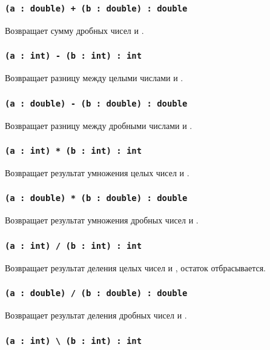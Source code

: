 \subsubsection{\lstinline|(a : double) + (b : double) : double|}

Возвращает сумму дробных чисел  и .

\subsubsection{\lstinline|(a : int) - (b : int) : int|}

Возвращает разницу между целыми числами  и .

\subsubsection{\lstinline|(a : double) - (b : double) : double|}

Возвращает разницу между дробными числами  и .

\subsubsection{\lstinline|(a : int) * (b : int) : int|}

Возвращает результат умножения целых чисел  и .

\subsubsection{\lstinline|(a : double) * (b : double) : double|}

Возвращает результат умножения дробных чисел  и .

\subsubsection{\lstinline|(a : int) / (b : int) : int|}

Возвращает результат деления целых чисел  и , остаток отбрасывается.

\subsubsection{\lstinline|(a : double) / (b : double) : double|}

Возвращает результат деления дробных чисел  и .

\subsubsection{\lstinline|(a : int) \ (b : int) : int|}


